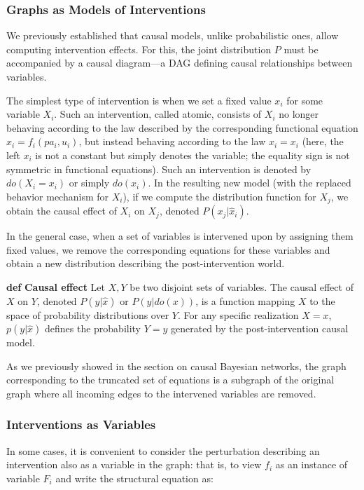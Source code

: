 \documentclass[fleqn]{article}
\def\define#1{\textbf{def} \textbf{#1}}
\numberwithin{equation}{section}
\numberwithin{theorem}{section}
\numberwithin{figure}{section}
\numberwithin{lemma}{section}
\numberwithin{corollary}{section}
\begin{document}
\subsubsection*{Graphs as Models of Interventions}
We previously established that causal models, unlike probabilistic ones, allow computing intervention effects. For this, the joint distribution $P$ must be accompanied by a causal diagram—a DAG defining causal relationships between variables.

The simplest type of intervention is when we set a fixed value $x_i$ for some variable $X_i$. Such an intervention, called atomic, consists of $X_i$ no longer behaving according to the law described by the corresponding functional equation $x_i = f_i(pa_i, u_i)$, but instead behaving according to the law $x_i = x_i$ (here, the left $x_i$ is not a constant but simply denotes the variable; the equality sign is not symmetric in functional equations). Such an intervention is denoted by $do(X_i = x_i)$ or simply $do(x_i)$. In the resulting new model (with the replaced behavior mechanism for $X_i$), if we compute the distribution function for $X_j$, we obtain the causal effect of $X_i$ on $X_j$, denoted $P(x_j | \hat x_i)$.

In the general case, when a set of variables is intervened upon by assigning them fixed values, we remove the corresponding equations for these variables and obtain a new distribution describing the post-intervention world.

\define{Causal effect} Let $X, Y$ be two disjoint sets of variables. The causal effect of $X$ on $Y$, denoted $P(y|\hat x)$ or $P(y | do(x))$, is a function mapping $X$ to the space of probability distributions over $Y$. For any specific realization $X = x$, $p(y|\hat x)$ defines the probability $Y = y$ generated by the post-intervention causal model.

As we previously showed in the section on causal Bayesian networks, the graph corresponding to the truncated set of equations is a subgraph of the original graph where all incoming edges to the intervened variables are removed.

\subsubsection*{Interventions as Variables}

In some cases, it is convenient to consider the perturbation describing an intervention also as a variable in the graph: that is, to view $f_i$ as an instance of variable $F_i$ and write the structural equation as:
\end{document}
